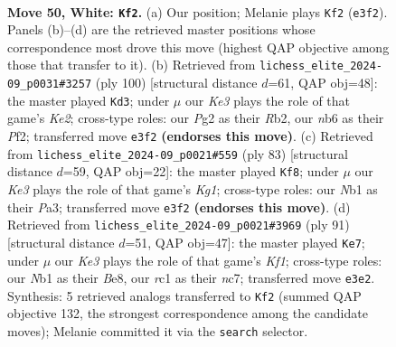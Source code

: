 \documentclass[11pt]{article}
\begin{document}
\clearpage

\begin{figure}[p]\centering
\begin{subfigure}{0.46\textwidth}\centering
\resizebox{\linewidth}{!}{%
\newchessgame
\chessboard[
  setfen={8/5pkp/1n4p1/p3p1P1/P3P3/1P2K1RP/6P1/RNrr4 w - - 14 50},
  showmover=false,
  pgfstyle=straightmove, color=movearrow, markmove={e3-f2}
]}
\caption{}
\end{subfigure}\hfill
\begin{subfigure}{0.46\textwidth}\centering
\resizebox{\linewidth}{!}{%
\newchessgame
\chessboard[
  setfen={8/2r1bk1p/1p2p1p1/1P2p3/2r4P/2N1P1P1/1RR1KP2/8 w - - 1 51},
  showmover=false,
  pgfstyle=straightmove, color=movearrow, markmove={e2-d3}
]}
\caption{}
\end{subfigure}
\\[4pt]
\begin{subfigure}{0.46\textwidth}\centering
\resizebox{\linewidth}{!}{%
\newchessgame
\chessboard[
  setfen={r5k1/5pp1/r3p2p/3p3P/3P4/p3P1P1/R4P2/R4K2 b - - 0 42},
  showmover=false,
  pgfstyle=straightmove, color=movearrow, markmove={g8-f8}
]}
\caption{}
\end{subfigure}\hfill
\begin{subfigure}{0.46\textwidth}\centering
\resizebox{\linewidth}{!}{%
\newchessgame
\chessboard[
  setfen={3Rbkr1/p1N5/1p5r/2p2p2/2P1p1p1/1PK1P3/P4P1p/3R4 b - - 1 46},
  showmover=false,
  pgfstyle=straightmove, color=movearrow, markmove={f8-e7}
]}
\caption{}
\end{subfigure}
\caption{\textbf{Move 50, White: \texttt{Kf2}.} (a) Our position; Melanie plays \texttt{Kf2} (\texttt{e3f2}). Panels (b)--(d) are the retrieved master positions whose correspondence most drove this move (highest QAP objective among those that transfer to it). (b) Retrieved from \texttt{lichess\_elite\_2024-09\_p0031\#3257} (ply 100) [structural distance $d$=61, QAP obj=48]: the master played \texttt{Kd3}; under $\mu$ our \emph{Ke3} plays the role of that game's \emph{Ke2}; cross-type roles: our \emph{P}g2 as their \emph{R}b2, our \emph{n}b6 as their \emph{P}f2; transferred move \texttt{e3f2} \textbf{(endorses this move)}. (c) Retrieved from \texttt{lichess\_elite\_2024-09\_p0021\#559} (ply 83) [structural distance $d$=59, QAP obj=22]: the master played \texttt{Kf8}; under $\mu$ our \emph{Ke3} plays the role of that game's \emph{Kg1}; cross-type roles: our \emph{N}b1 as their \emph{P}a3; transferred move \texttt{e3f2} \textbf{(endorses this move)}. (d) Retrieved from \texttt{lichess\_elite\_2024-09\_p0021\#3969} (ply 91) [structural distance $d$=51, QAP obj=47]: the master played \texttt{Ke7}; under $\mu$ our \emph{Ke3} plays the role of that game's \emph{Kf1}; cross-type roles: our \emph{N}b1 as their \emph{B}e8, our \emph{r}c1 as their \emph{n}c7; transferred move \texttt{e3e2}. Synthesis: 5 retrieved analogs transferred to \texttt{Kf2} (summed QAP objective 132, the strongest correspondence among the candidate moves); Melanie committed it via the \texttt{search} selector.}
\label{fig:thought-m98}
\end{figure}
\end{document}

